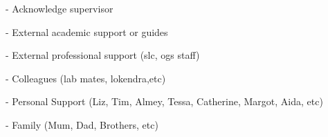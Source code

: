 \cleardoublepage



\begin{acknowledgements}
\addchaptertocentry{\acknowledgementname} %

- Acknowledge supervisor

- External academic support or guides

- External professional support (slc, ogs staff)

- Colleagues (lab mates, lokendra,etc)

- Personal Support (Liz, Tim, Almey, Tessa, Catherine, Margot, Aida, etc)

- Family (Mum, Dad, Brothers, etc)

\end{acknowledgements}